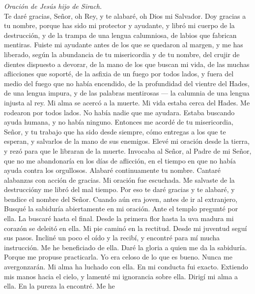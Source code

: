 \emph{Oración de Jesús hijo de Sirach.}\\
 Te daré gracias, Señor, oh Rey, y te alabaré, oh Dios mi
Salvador. Doy gracias a tu nombre,  porque has sido mi
protector y ayudante, y libró mi cuerpo de la destrucción, y de la
trampa de una lengua calumniosa, de labios que fabrican mentiras. Fuiste
mi ayudante antes de los que se quedaron al margen,  y me
has liberado, según la abundancia de tu misericordia y de tu nombre, del
crujir de dientes dispuesto a devorar, de la mano de los que buscan mi
vida, de las muchas aflicciones que soporté,  de la
asfixia de un fuego por todos lados, y fuera del medio del fuego que no
había encendido,  de la profundidad del vientre del Hades,
de una lengua impura, y de las palabras mentirosas ---  la
calumnia de una lengua injusta al rey. Mi alma se acercó a la muerte. Mi
vida estaba cerca del Hades.  Me rodearon por todos lados.
No había nadie que me ayudara. Estaba buscando ayuda humana, y no había
ninguno.  Entonces me acordé de tu misericordia, Señor, y
tu trabajo que ha sido desde siempre, cómo entregas a los que te
esperan, y salvarlos de la mano de sus enemigos.  Elevé mi
oración desde la tierra, y rezó para que le libraran de la muerte.
 Invocaba al Señor, al Padre de mi Señor, que no me
abandonaría en los días de aflicción, en el tiempo en que no había ayuda
contra los orgullosos.  Alabaré continuamente tu nombre.
Cantaré alabanzas con acción de gracias. Mi oración fue escuchada.
 Me salvaste de la destruccióny me libró del mal tiempo.
Por eso te daré gracias y te alabaré, y bendice el nombre del Señor.
 Cuando aún era joven, antes de ir al extranjero, Busqué
la sabiduría abiertamente en mi oración.  Ante el templo
pregunté por ella. La buscaré hasta el final.  Desde la
primera flor hasta la uva madura mi corazón se deleitó en ella. Mi pie
caminó en la rectitud. Desde mi juventud seguí sus pasos.
 Incliné un poco el oído y la recibí, y encontré para mí
mucha instrucción.  Me he beneficiado de ella. Daré la
gloria a quien me da la sabiduría.  Porque me propuse
practicarla. Yo era celoso de lo que es bueno. Nunca me avergonzarán.
 Mi alma ha luchado con ella. En mi conducta fui exacto.
Extiendo mis manos hacia el cielo, y lamenté mi ignorancia sobre ella.
 Dirigí mi alma a ella. En la pureza la encontré. Me he
